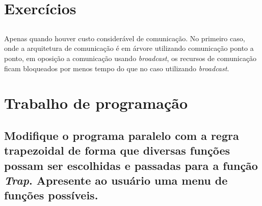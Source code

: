 \documentclass[11pt,a4paper,onecolumn]{article}
\begin{document}
\section{Exercícios}
\subsection{}
Apenas quando houver custo consider\'avel de comunica\c{c}\~ao.
No primeiro caso, onde a arquitetura de comunica\c{c}\~ao \'e em \'arvore utilizando comunica\c{c}\~ao ponto a ponto, em oposi\c{c}\~ao a comunica\c{c}\~ao usando \textit{broadcast}, os recursos de comunica\c{c}\~ao ficam bloqueados por menos tempo do que no caso utilizando \textit{broadcast}.

\subsection{}

\section{Trabalho de programação}
\subsection{Modifique o programa paralelo com a regra trapezoidal de forma que diversas funções possam ser escolhidas e passadas para a função \textit{Trap}. Apresente ao usuário uma menu de funções possíveis.}
\end{document}
